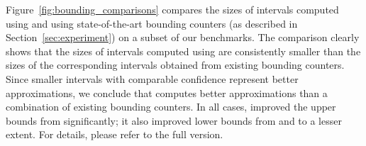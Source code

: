 Figure~\ref{fig:bounding_comparisons} compares the sizes of intervals
computed using {\ApproxMC} and using state-of-the-art bounding
counters (as described in Section~\ref{sec:experiment}) on a subset of
our benchmarks.  The comparison clearly shows that the sizes of
intervals computed using {\ApproxMC} are consistently smaller than the
sizes of the corresponding intervals obtained from existing bounding
counters.  Since smaller intervals with comparable confidence
represent better approximations, we conclude that {\approxMC} computes
better approximations than a combination of existing bounding
counters. In all cases, {\approxMC} improved the upper bounds from {\MiniCount} significantly; it also improved lower bounds from {\SampleCount} and {\MBound} to a lesser extent. For details, please refer to the full version. 
%

%
%
%
%
%
%
%
%
%
%
%
%
%
%
%
%
%
%
%
%
%
%
%
%
%
%
%
%
%
%
%
%
%
%
%
%
%
%
%
%
%
%
%
%
%
%
%
%
%
%
%
%
%
%
%
%
%
%
%
%
%
%
%
%
%
%
%
%
%
%
%
%
%
%
%
%
%
%
%
%
%
%
%
%
%
%
%
%
%
%
%
%
%
%
%
%
%
%
%
%
%
%
%
%
%
%
%
%
%
%
%
%
%
%
%
%
%
%
%
%
